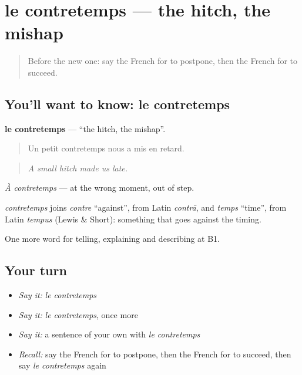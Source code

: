 \section[le contretemps]{le contretemps — the hitch, the mishap}

\label{lesson:FR-C275-contretemps}



\begin{quote}
Before the new one: say the French for to postpone, then the French for to succeed.
\end{quote}

\subsection*{You'll want to know: le contretemps}
\textbf{le contretemps} — \textquotedblleft{}the hitch, the mishap\textquotedblright{}.

\begin{quote}
Un petit contretemps nous a mis en retard.
\end{quote}

\begin{quote}
\emph{A small hitch made us late.}
\end{quote}

\emph{À contretemps} — at the wrong moment, out of step.

\begin{cousinweb}
\emph{contretemps} joins \emph{contre} \textquotedblleft{}against\textquotedblright{}, from Latin \emph{contrā}, and \emph{temps} \textquotedblleft{}time\textquotedblright{}, from Latin \emph{tempus} (Lewis \& Short): something that goes against the timing.
\end{cousinweb}

\begin{grammarlens}[title={What you've built}]
One more word for telling, explaining and describing at B1.
\end{grammarlens}

\subsection*{Your turn}
\begin{itemize}
\raggedright
  \item \emph{Say it:} \emph{le contretemps}
  \item \emph{Say it:} \emph{le contretemps}, once more
  \item \emph{Say it:} a sentence of your own with \emph{le contretemps}
  \item \emph{Recall:} say the French for to postpone, then the French for to succeed, then say \emph{le contretemps} again
\end{itemize}

